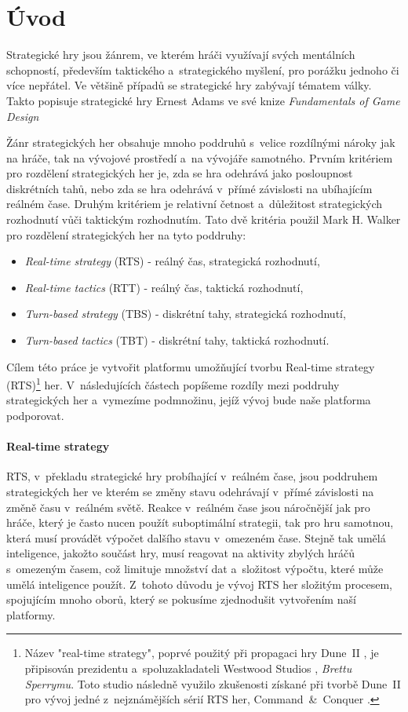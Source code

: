\chapter{Úvod}
\label{sec:uvod}

Strategické hry jsou žánrem, ve kterém hráči využívají svých mentálních schopností, především taktického a~strategického myšlení, pro porážku jednoho či více nepřátel. Ve většině případů se strategické hry zabývají tématem války. Takto popisuje strategické hry Ernest Adams ve své knize \textit{Fundamentals of Game Design} \citep[str.~419]{book:gamefund}

Žánr strategických her obsahuje mnoho poddruhů s~velice rozdílnými nároky jak na hráče, tak na vývojové prostředí a~na vývojáře samotného. Prvním kritériem pro rozdělení strategických her je, zda se hra odehrává jako posloupnost diskrétních tahů, nebo zda se hra odehrává v~přímé závislosti na ubíhajícím reálném čase. Druhým kritériem je relativní četnost a~důležitost strategických rozhodnutí vůči taktickým rozhodnutím. Tato dvě kritéria použil Mark H. Walker \citep{site:stratg05} pro rozdělení strategických her na tyto poddruhy:
\begin{itemize}
	\item \emph{Real-time strategy} (RTS) - reálný čas, strategická rozhodnutí,
	\item \emph{Real-time tactics} (RTT) - reálný čas, taktická rozhodnutí,
	\item \emph{Turn-based strategy} (TBS) - diskrétní tahy, strategická rozhodnutí,
	\item \emph{Turn-based tactics} (TBT) - diskrétní tahy, taktická rozhodnutí.
\end{itemize}

Cílem této práce je vytvořit platformu umožňující tvorbu Real-time strategy (RTS)\footnote{Název "real-time strategy", poprvé použitý při propagaci hry Dune~II \citep{site:dune2}, je připisován prezidentu a~spoluzakladateli Westwood Studios \citep{site:westwood}, \emph{Brettu Sperrymu}. Toto studio následně využilo zkušenosti získané při tvorbě Dune~II pro vývoj jedné z~nejznámějších sérií RTS her, Command~\&~Conquer \citep{site:cmdcnq}.} her. V~následujících částech popíšeme rozdíly mezi poddruhy strategických her a~vymezíme podmnožinu, jejíž vývoj bude naše platforma podporovat. 

\subsubsection{Real-time strategy}
 RTS, v~překladu strategické hry probíhající v~reálném čase, jsou poddruhem strategických her ve kterém se změny stavu odehrávají v~přímé závislosti na změně času v~reálném světě. Reakce v~reálném čase jsou náročnější jak pro hráče, který je často nucen použít suboptimální strategii, tak pro hru samotnou, která musí provádět výpočet dalšího stavu v~omezeném čase. Stejně tak umělá inteligence, jakožto součást hry, musí reagovat na aktivity zbylých hráčů s~omezeným časem, což limituje množství dat a~složitost výpočtu, které může umělá inteligence použít. Z~tohoto důvodu je vývoj RTS her složitým procesem, spojujícím mnoho oborů, který se pokusíme zjednodušit vytvořením naší platformy.

